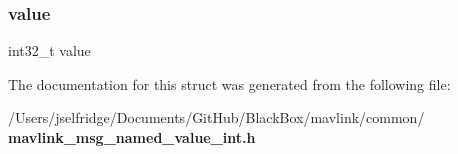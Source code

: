 \mbox{\label{struct____mavlink__named__value__int__t_a01571c420f280137c16d319178731da5}} 
\subsubsection{value}
{\footnotesize\ttfamily int32\+\_\+t value}



The documentation for this struct was generated from the following file\+:\begin{DoxyCompactItemize}
\item 
/\+Users/jselfridge/\+Documents/\+Git\+Hub/\+Black\+Box/mavlink/common/\textbf{ mavlink\+\_\+msg\+\_\+named\+\_\+value\+\_\+int.\+h}\end{DoxyCompactItemize}
